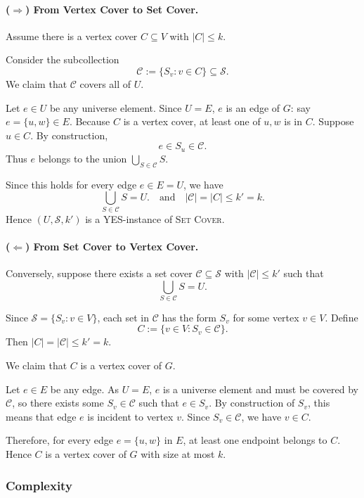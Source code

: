 \documentclass[9pt]{extarticle}
\begin{document}
\paragraph{($\Rightarrow$) From Vertex Cover to Set Cover.}

Assume there is a vertex cover $C \subseteq V$ with $|C| \le k$.

Consider the subcollection
\[
    \mathcal{C} := \{ S_v : v \in C \} \subseteq \mathcal{S}.
\]
We claim that $\mathcal{C}$ covers all of $U$.

Let $e \in U$ be any universe element.  Since $U = E$, $e$ is an edge of $G$:
say $e = \{u,w\} \in E$.  Because $C$ is a vertex cover, at least one of
$u,w$ is in $C$.  Suppose $u \in C$.  By construction,
\[
    e \in S_u \in \mathcal{C}.
\]
Thus $e$ belongs to the union $\bigcup_{S \in \mathcal{C}} S$.

Since this holds for every edge $e \in E = U$, we have
\[
    \bigcup_{S \in \mathcal{C}} S = U.
    \quad\text{and}\quad
    |\mathcal{C}| = |C| \le k' = k.
\]
Hence $(U,\mathcal{S},k')$ is a YES-instance of \textsc{Set Cover}.

\paragraph{($\Leftarrow$) From Set Cover to Vertex Cover.}

Conversely, suppose there exists a set cover
$\mathcal{C} \subseteq \mathcal{S}$ with $|\mathcal{C}| \le k'$ such that
\[
    \bigcup_{S \in \mathcal{C}} S = U.
\]

Since $\mathcal{S} = \{S_v : v \in V\}$, each set in $\mathcal{C}$ has the
form $S_v$ for some vertex $v \in V$.  Define
\[
    C := \{ v \in V : S_v \in \mathcal{C} \}.
\]
Then $|C| = |\mathcal{C}| \le k' = k$.

We claim that $C$ is a vertex cover of $G$.

Let $e \in E$ be any edge.  As $U = E$, $e$ is a universe element and must be
covered by $\mathcal{C}$, so there exists some $S_v \in \mathcal{C}$ such that
$e \in S_v$.  By construction of $S_v$, this means that edge $e$ is incident
to vertex $v$.  Since $S_v \in \mathcal{C}$, we have $v \in C$.

Therefore, for every edge $e = \{u,w\}$ in $E$, at least one endpoint belongs
to $C$.  Hence $C$ is a vertex cover of $G$ with size at most $k$.

\subsubsection*{Complexity}
\end{document}
